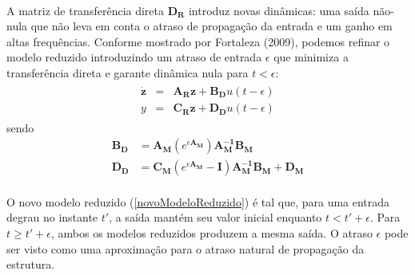 \documentclass[a4paper,11pt]{scrartcl} %
\numberwithin{equation}{section} %
\numberwithin{figure}{section} %
\numberwithin{table}{section} %
\begin{document}
\paragraph{} A matriz de transferência direta $\mathbf{D_R}$ introduz novas dinâmicas: uma saída não-nula que não leva em conta o atraso de propagação da entrada e um ganho em altas frequências. Conforme mostrado por Fortaleza (2009), podemos refinar o modelo reduzido introduzindo um atraso de entrada $\epsilon$ que minimiza a transferência direta e garante dinâmica nula para $t < \epsilon$: \begin{align}
\begin{array}{lll}
	\mathbf{\dot{z}} &=& \mathbf{A_R}\mathbf{z}+\mathbf{B_D}u(t-\epsilon)\\
	y &=& \mathbf{C_R}\mathbf{z}+\mathbf{D_D}u(t-\epsilon) \label{novoModeloReduzido}
\end{array}
\end{align} sendo \begin{align}
	\mathbf{B_D} &= \mathbf{A_M}\left(e^{\epsilon\mathbf{A_M}}\right)\mathbf{A_M^{-1}}\mathbf{B_M}\\
	\mathbf{D_D} &= \mathbf{C_M}\left(e^{\epsilon\mathbf{A_M}} - \mathbf{I}\right)\mathbf{A_M^{-1}}\mathbf{B_M} + \mathbf{D_M}
\end{align}

\paragraph{} O novo modelo reduzido (\ref{novoModeloReduzido}) é tal que, para uma entrada degrau no instante $t'$, a saída mantém seu valor inicial enquanto $t < t' + \epsilon$. Para $t \ge t' + \epsilon$, ambos os modelos reduzidos produzem a mesma saída. O atraso $\epsilon$ pode ser visto como uma aproximação para o atraso natural de propagação da estrutura.
\end{document}
